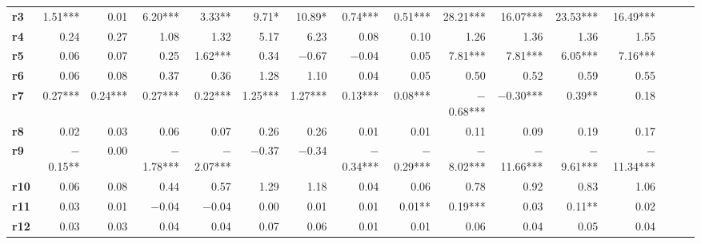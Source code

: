 \begin{tabular}{@{\extracolsep{5pt}}lrrrrrrrrrrrrrrr}
{\bf r3} & 1.51*** & 0.01\phantom{***} & 6.20*** & 3.33**\phantom{*} & 9.71*\phantom{**} & 10.89*\phantom{**} & 0.74*** & 0.51*** & 28.21*** & 16.07*** & 23.53*** & 16.49*** \\
{\bf r4} & 0.24\phantom{***} & 0.27\phantom{***} & 1.08\phantom{***} & 1.32\phantom{***} & 5.17\phantom{***} & 6.23\phantom{***} & 0.08\phantom{***} & 0.10\phantom{***} & 1.26\phantom{***} & 1.36\phantom{***} & 1.36\phantom{***} & 1.55\phantom{***} \\
{\bf r5} & 0.06\phantom{***} & 0.07\phantom{***} & 0.25\phantom{***} & 1.62*** & 0.34\phantom{***} & $-$0.67\phantom{***} & $-$0.04\phantom{***} & 0.05\phantom{***} & 7.81*** & 7.81*** & 6.05*** & 7.16*** \\
{\bf r6} & 0.06\phantom{***} & 0.08\phantom{***} & 0.37\phantom{***} & 0.36\phantom{***} & 1.28\phantom{***} & 1.10\phantom{***} & 0.04\phantom{***} & 0.05\phantom{***} & 0.50\phantom{***} & 0.52\phantom{***} & 0.59\phantom{***} & 0.55\phantom{***} \\
{\bf r7} & 0.27*** & 0.24*** & 0.27*** & 0.22*** & 1.25*** & 1.27*** & 0.13*** & 0.08*** & $-$0.68*** & $-$0.30*** & 0.39**\phantom{*} & 0.18\phantom{***} \\
{\bf r8} & 0.02\phantom{***} & 0.03\phantom{***} & 0.06\phantom{***} & 0.07\phantom{***} & 0.26\phantom{***} & 0.26\phantom{***} & 0.01\phantom{***} & 0.01\phantom{***} & 0.11\phantom{***} & 0.09\phantom{***} & 0.19\phantom{***} & 0.17\phantom{***} \\
{\bf r9} & $-$0.15**\phantom{*} & 0.00\phantom{***} & $-$1.78*** & $-$2.07*** & $-$0.37\phantom{***} & $-$0.34\phantom{***} & $-$0.34*** & $-$0.29*** & $-$8.02*** & $-$11.66*** & $-$9.61*** & $-$11.34*** \\
{\bf r10} & 0.06\phantom{***} & 0.08\phantom{***} & 0.44\phantom{***} & 0.57\phantom{***} & 1.29\phantom{***} & 1.18\phantom{***} & 0.04\phantom{***} & 0.06\phantom{***} & 0.78\phantom{***} & 0.92\phantom{***} & 0.83\phantom{***} & 1.06\phantom{***} \\
{\bf r11} & 0.03\phantom{***} & 0.01\phantom{***} & $-$0.04\phantom{***} & $-$0.04\phantom{***} & 0.00\phantom{***} & 0.01\phantom{***} & 0.01\phantom{***} & 0.01**\phantom{*} & 0.19*** & 0.03\phantom{***} & 0.11**\phantom{*} & 0.02\phantom{***} \\
{\bf r12} & 0.03\phantom{***} & 0.03\phantom{***} & 0.04\phantom{***} & 0.04\phantom{***} & 0.07\phantom{***} & 0.06\phantom{***} & 0.01\phantom{***} & 0.01\phantom{***} & 0.06\phantom{***} & 0.04\phantom{***} & 0.05\phantom{***} & 0.04\phantom{***} \\
\hline
\end{tabular}
